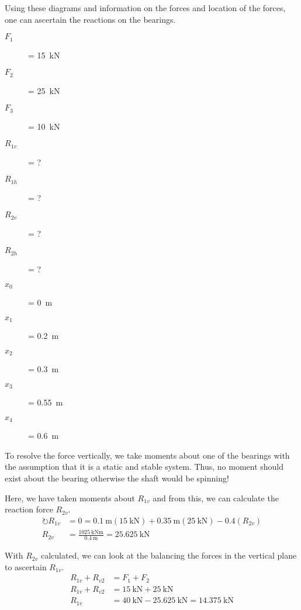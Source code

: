 Using these diagrams and information on the forces and location of the forces, one can ascertain the reactions on the bearings.

\begin{multicols}{4}
\begin{description}
    \item[$F_1$] = \SI{15}{\kilo\newton}
    \item[$F_2$] = \SI{25}{\kilo\newton}
    \item[$F_3$] = \SI{10}{\kilo\newton}
    \item[$R_{1v}$] = ?
    \item[$R_{1h}$] = ?
    \item[$R_{2v}$] = ?
    \item[$R_{2h}$] = ?
    \item[$x_0$] = \SI{0}{\metre}
    \item[$x_1$] = \SI{0.2}{\metre}
    \item[$x_2$] = \SI{0.3}{\metre}
    \item[$x_3$] = \SI{0.55}{\metre}
    \item[$x_4$] = \SI{0.6}{\metre}
\end{description}
\end{multicols}

To  resolve the force vertically, we take moments about one of the bearings with the assumption that it is a static and stable system. Thus, no moment should exist about the bearing otherwise the shaft would be spinning!

Here, we have taken moments about $R_{1v}$ and from this, we can calculate the reaction force $R_{2v}$. 
\begin{align}
  \circlearrowright R_{1v} &= 0 = \SI{0.1}{\metre}(\SI{15}{\kilo\newton}) + \SI{0.35}{\metre}(\SI{25}{\kilo\newton}) - 0.4(R_{2v}) \\
  R_{2v} &= \frac{\SI{1025}{\kilo\newton\metre}}{\SI{0.4}{\metre}} = \SI{25.625}{\kilo\newton}
\end{align}

With $R_{2v}$ calculated, we can look at the balancing the forces in the vertical plane to ascertain $R_{1v}$.
\begin{align}
  R_{1v}+R_{v2}&=F_1+F_2\\
  R_{1v}+R_{v2}&=\SI{15}{\kilo\newton}+\SI{25}{\kilo\newton}\\
  R_{1v} &= \SI{40}{\kilo\newton}-\SI{25.625}{\kilo\newton} = \SI{14.375}{\kilo\newton}
\end{align}

